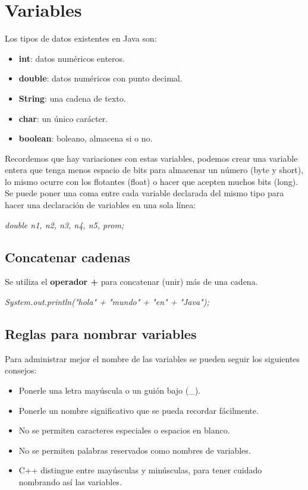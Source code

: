 \section{Variables}
Los tipos de datos existentes en Java son:
\begin{itemize}
    \item \textbf{int}: datos numéricos enteros.
    \item \textbf{double}: datos numéricos con punto decimal.
    \item \textbf{String}: una cadena de texto.
    \item \textbf{char}: un único carácter.
    \item \textbf{boolean}: boleano, almacena si o no.
\end{itemize}
Recordemos que hay variaciones con estas variables, podemos crear una variable entera que tenga menos espacio de bits para almacenar un número (byte y short), lo mismo ocurre con los flotantes (float) o hacer que acepten muchos bits (long).\\
Se puede poner una coma entre cada variable declarada del mismo tipo para hacer una declaración de variables en una sola línea:\begin{center}\textit{double n1, n2, n3, n4, n5, prom;}\end{center}

\subsection{Concatenar cadenas}
Se utiliza el \textbf{operador +} para concatenar (unir) más de una cadena.\begin{center}\textit{System.out.println("hola" + "mundo" + "en" + "Java");}\end{center}

\subsection{Reglas para nombrar variables}
Para administrar mejor el nombre de las variables se pueden seguir los siguientes consejos:
\begin{itemize}
    \item Ponerle una letra mayúscula o un guión bajo (\_).
    \item Ponerle un nombre significativo que se pueda recordar fácilmente.
    \item No se permiten caracteres especiales o espacios en blanco.
    \item No se permiten palabras reservados como nombres de variables.
    \item C++ distingue entre mayúsculas y minúsculas, para tener cuidado nombrando así las variables.
\end{itemize}



